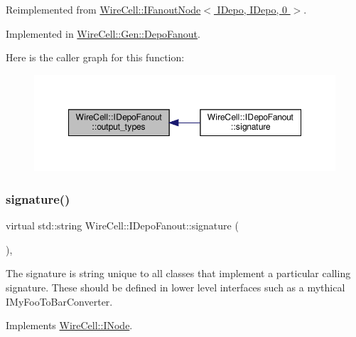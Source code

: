 Reimplemented from \hyperlink{class_wire_cell_1_1_i_fanout_node_a2191dc9d44b35d6ff4bda5d5356c6ac5}{Wire\+Cell\+::\+I\+Fanout\+Node$<$ I\+Depo, I\+Depo, 0 $>$}.



Implemented in \hyperlink{class_wire_cell_1_1_gen_1_1_depo_fanout_acb986929b5cd38a5ea197985b103102f}{Wire\+Cell\+::\+Gen\+::\+Depo\+Fanout}.

Here is the caller graph for this function\+:
\nopagebreak
\begin{figure}[H]
\begin{center}
\leavevmode
\includegraphics[width=348pt]{class_wire_cell_1_1_i_depo_fanout_ade8cfbdf790d316516ab8f7a97818f8e_icgraph}
\end{center}
\end{figure}
\mbox{\label{class_wire_cell_1_1_i_depo_fanout_a1c41ee7c457b895198b509027686bd53}} 
\subsubsection{\texorpdfstring{signature()}{signature()}}
{\footnotesize\ttfamily virtual std\+::string Wire\+Cell\+::\+I\+Depo\+Fanout\+::signature (\begin{DoxyParamCaption}{ }\end{DoxyParamCaption})\hspace{0.3cm}{\ttfamily [inline]}, {\ttfamily [virtual]}}

The signature is string unique to all classes that implement a particular calling signature. These should be defined in lower level interfaces such as a mythical I\+My\+Foo\+To\+Bar\+Converter. 

Implements \hyperlink{class_wire_cell_1_1_i_node_a0b0763465adf5ba7febe8e378162b584}{Wire\+Cell\+::\+I\+Node}.



